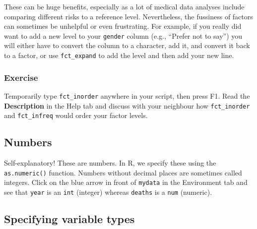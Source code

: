 \documentclass[12pt,]{krantz}
\makeatletter
\newenvironment{Shaded}{\begin{snugshade}}{\end{snugshade}}
\newcommand{\CommentTok}[1]{\textcolor[rgb]{0.56,0.35,0.01}{\textit{#1}}}
\newcommand{\KeywordTok}[1]{\textcolor[rgb]{0.13,0.29,0.53}{\textbf{#1}}}
\newcommand{\NormalTok}[1]{#1}
\newcommand{\OperatorTok}[1]{\textcolor[rgb]{0.81,0.36,0.00}{\textbf{#1}}}
\newcommand{\StringTok}[1]{\textcolor[rgb]{0.31,0.60,0.02}{#1}}
\newenvironment{kframe}{%
\medskip{}
\setlength{\fboxsep}{.8em}
 \def\at@end@of@kframe{}%
 \ifinner\ifhmode%
  \def\at@end@of@kframe{\end{minipage}}%
  \begin{minipage}{\columnwidth}%
 \fi\fi%
 \def\FrameCommand##1{\hskip\@totalleftmargin \hskip-\fboxsep
 \colorbox{shadecolor}{##1}\hskip-\fboxsep
     \hskip-\linewidth \hskip-\@totalleftmargin \hskip\columnwidth}%
 \MakeFramed {\advance\hsize-\width
   \@totalleftmargin\z@ \linewidth\hsize
   \@setminipage}}%
 {\par\unskip\endMakeFramed%
 \at@end@of@kframe}
\renewenvironment{Shaded}{\begin{kframe}}{\end{kframe}}
\theoremstyle{definition}
\theoremstyle{definition}
\theoremstyle{definition}
\theoremstyle{remark}
\makeatother
\begin{document}
These can be huge benefits, especially as a lot of medical data analyses
include comparing different risks to a reference level. Nevertheless,
the fussiness of factors can sometimes be unhelpful or even frustrating.
For example, if you really did want to add a new level to your
\texttt{gender} column (e.g., ``Prefer not to say'') you will either
have to convert the column to a character, add it, and convert it back
to a factor, or use \texttt{fct\_expand} to add the level and then add
your new line.

\hypertarget{exercise-3}{%
\subsubsection{Exercise}\label{exercise-3}}

Temporarily type \texttt{fct\_inorder} anywhere in your script, then
press F1. Read the \textbf{Description} in the Help tab and discuss with
your neighbour how \texttt{fct\_inorder} and \texttt{fct\_infreq} would
order your factor levels.

\hypertarget{numbers}{%
\subsection{Numbers}\label{numbers}}

Self-explanatory! These are numbers. In R, we specify these using the
\texttt{as.numeric()} function. Numbers without decimal places are
sometimes called integers. Click on the blue arrow in front of
\texttt{mydata} in the Environment tab and see that \texttt{year} is an
\texttt{int} (integer) whereas \texttt{deaths} is a \texttt{num}
(numeric).

\hypertarget{specifying-variable-types}{%
\subsection{Specifying variable types}\label{specifying-variable-types}}

\begin{Shaded}
\end{Shaded}
\end{document}
